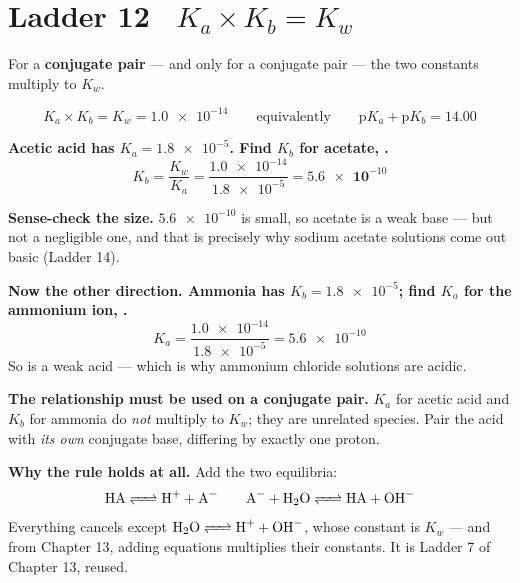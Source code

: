\documentclass{apchem-worksheet}
\begin{document}
\section*{\sffamily Ladder 12 \textbullet\ $K_{a} \times K_{b} = K_{w}$}

For a \textbf{conjugate pair} --- and only for a conjugate pair --- the
two constants multiply to $K_{w}$.

\[ K_{a} \times K_{b} = K_{w} = \num{1.0e-14}
   \qquad\text{equivalently}\qquad
   \text{p}K_{a} + \text{p}K_{b} = 14.00 \]

\begin{center}
\end{center}

\begin{workedexample}
\textbf{Acetic acid has $K_{a} = \num{1.8e-5}$. Find $K_{b}$ for
acetate, .}
\[ K_{b} = \frac{K_{w}}{K_{a}}
         = \frac{\num{1.0e-14}}{\num{1.8e-5}}
         = \mathbf{\num{5.6e-10}} \]

\textbf{Sense-check the size.} $\num{5.6e-10}$ is small, so acetate is a
weak base --- but not a negligible one, and that is precisely why sodium
acetate solutions come out basic (Ladder 14).

\textbf{Now the other direction. Ammonia has $K_{b} = \num{1.8e-5}$;
find $K_{a}$ for the ammonium ion, .}
\[ K_{a} = \frac{\num{1.0e-14}}{\num{1.8e-5}} = \num{5.6e-10} \]
So  is a weak acid --- which is why ammonium chloride
solutions are acidic.

\textbf{The relationship must be used on a conjugate pair.} $K_{a}$ for
acetic acid and $K_{b}$ for ammonia do \emph{not} multiply to $K_{w}$;
they are unrelated species. Pair the acid with \emph{its own} conjugate
base, differing by exactly one proton.

\textbf{Why the rule holds at all.} Add the two equilibria:
\[ \ce{HA <=> H+ + A-}
   \qquad
   \ce{A- + H2O <=> HA + OH-} \]
Everything cancels except $\ce{H2O <=> H+ + OH-}$, whose constant is
$K_{w}$ --- and from Chapter 13, adding equations multiplies their
constants. It is Ladder 7 of Chapter 13, reused.
\end{workedexample}
\end{document}
